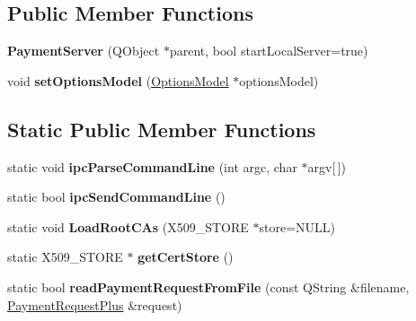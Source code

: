 \subsection*{Public Member Functions}
\begin{DoxyCompactItemize}
\item 
\mbox{\label{class_payment_server_a4a66f55c11f4757b121179d5d6988ab2}} 
{\bfseries Payment\+Server} (Q\+Object $\ast$parent, bool start\+Local\+Server=true)
\item 
\mbox{\label{class_payment_server_a468fb163f5172c8428c434631aeb4132}} 
void {\bfseries set\+Options\+Model} (\mbox{\hyperlink{class_options_model}{Options\+Model}} $\ast$options\+Model)
\end{DoxyCompactItemize}
\subsection*{Static Public Member Functions}
\begin{DoxyCompactItemize}
\item 
\mbox{\label{class_payment_server_a6fa5530162603b2b07d0398ead7ce0b3}} 
static void {\bfseries ipc\+Parse\+Command\+Line} (int argc, char $\ast$argv\mbox{[}$\,$\mbox{]})
\item 
\mbox{\label{class_payment_server_a1cc71c8771bce09eac09f342a4d48220}} 
static bool {\bfseries ipc\+Send\+Command\+Line} ()
\item 
\mbox{\label{class_payment_server_a7371f1dd4896d83274f8784b42f288eb}} 
static void {\bfseries Load\+Root\+C\+As} (X509\+\_\+\+S\+T\+O\+RE $\ast$store=N\+U\+LL)
\item 
\mbox{\label{class_payment_server_ac3b7495238d833e76beb2fe11c0f6055}} 
static X509\+\_\+\+S\+T\+O\+RE $\ast$ {\bfseries get\+Cert\+Store} ()
\item 
\mbox{\label{class_payment_server_a5fbb46e6092e961e743363be7b398da7}} 
static bool {\bfseries read\+Payment\+Request\+From\+File} (const Q\+String \&filename, \mbox{\hyperlink{class_payment_request_plus}{Payment\+Request\+Plus}} \&request)
\end{DoxyCompactItemize}
